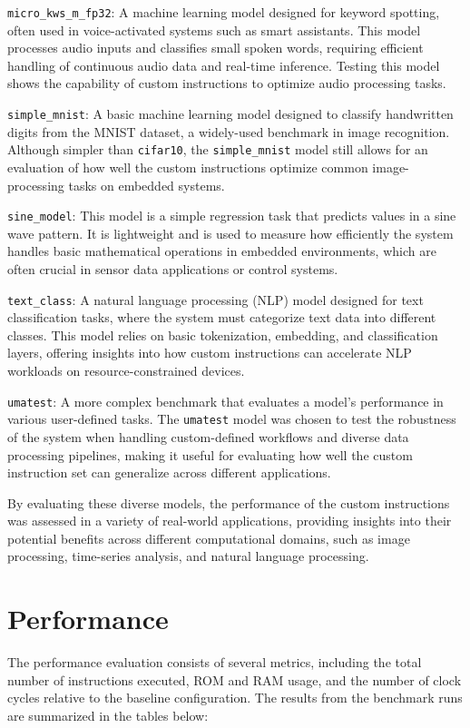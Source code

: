 \texttt{micro\_kws\_m\_fp32}: A machine learning model designed for keyword spotting, often used in voice-activated systems such as smart assistants. This model processes audio inputs and classifies small spoken words, requiring efficient handling of continuous audio data and real-time inference. Testing this model shows the capability of custom instructions to optimize audio processing tasks.

\texttt{simple\_mnist}: A basic machine learning model designed to classify handwritten digits from the MNIST dataset, a widely-used benchmark in image recognition. Although simpler than \texttt{cifar10}, the \texttt{simple\_mnist} model still allows for an evaluation of how well the custom instructions optimize common image-processing tasks on embedded systems.

\texttt{sine\_model}: This model is a simple regression task that predicts values in a sine wave pattern. It is lightweight and is used to measure how efficiently the system handles basic mathematical operations in embedded environments, which are often crucial in sensor data applications or control systems.

\texttt{text\_class}: A natural language processing (NLP) model designed for text classification tasks, where the system must categorize text data into different classes. This model relies on basic tokenization, embedding, and classification layers, offering insights into how custom instructions can accelerate NLP workloads on resource-constrained devices.

\texttt{umatest}: A more complex benchmark that evaluates a model's performance in various user-defined tasks. The \texttt{umatest} model was chosen to test the robustness of the system when handling custom-defined workflows and diverse data processing pipelines, making it useful for evaluating how well the custom instruction set can generalize across different applications.

By evaluating these diverse models, the performance of the custom instructions was assessed in a variety of real-world applications, providing insights into their potential benefits across different computational domains, such as image processing, time-series analysis, and natural language processing.

\section{Performance}

The performance evaluation consists of several metrics, including the total number of instructions executed, ROM and RAM usage, and the number of clock cycles relative to the baseline configuration. The results from the benchmark runs are summarized in the tables below:


